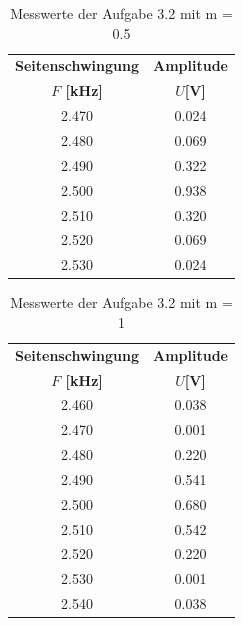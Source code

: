 \documentclass[12pt]{scrartcl}
\begin{document}
  \begin{table}[H] 
     \centering
     \begin{tabular}{|c|c|} 
           \hline \textbf{Seitenschwingung} & \textbf{Amplitude} \\ 
           \textbf{ $F$ [kHz]}    & \textbf{$U$[V]}       \\ \hline
           2.470  & 0.024 \\ \hline
           2.480& 0.069 \\ \hline
           2.490 &0.322 \\ \hline
           2.500 &0.938 \\ \hline
           2.510 & 0.320 \\ \hline  
           2.520 & 0.069 \\ \hline  
           2.530 & 0.024 \\\hline
      
     \end{tabular}
     \caption{Messwerte der Aufgabe 3.2 mit m = 0.5 } \label{tab:Aufgabe3.2_m=0.5}
 \end{table}

  \begin{table}[H] 
     \centering
     \begin{tabular}{|c|c|} 
           \hline \textbf{Seitenschwingung} & \textbf{Amplitude} \\ 
           \textbf{ $F$ [kHz]}    & \textbf{$U$[V]}       \\ \hline
            2.460  & 0.038 \\ \hline
            2.470  & 0.001 \\ \hline
           2.480& 0.220 \\ \hline
           2.490 &0.541 \\ \hline
           2.500 &0.680 \\ \hline
           2.510 & 0.542 \\ \hline  
           2.520 & 0.220 \\ \hline  
           2.530 & 0.001 \\ \hline  
           2.540 & 0.038 \\\hline
     \end{tabular}
     \caption{Messwerte der Aufgabe 3.2 mit m = 1 } \label{tab:Aufgabe3.2_m=1}
 \end{table}


\end{document}

